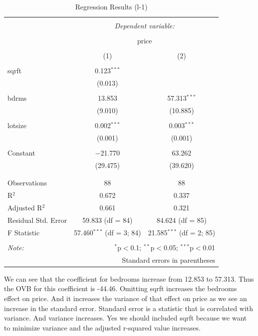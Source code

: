 \documentclass[
  12pt,
  landscape]{article}
\begin{document}
\begin{table}[!htbp] \centering 
  \caption{Regression Results (l-1)} 
  \label{} 
\begin{tabular}{@{\extracolsep{5pt}}lcc} 
\\[-1.8ex]\hline 
\hline \\[-1.8ex] 
 & \multicolumn{2}{c}{\textit{Dependent variable:}} \\ 
\cline{2-3} 
\\[-1.8ex] & \multicolumn{2}{c}{price} \\ 
\\[-1.8ex] & (1) & (2)\\ 
\hline \\[-1.8ex] 
 sqrft & 0.123$^{***}$ &  \\ 
  & (0.013) &  \\ 
  & & \\ 
 bdrms & 13.853 & 57.313$^{***}$ \\ 
  & (9.010) & (10.885) \\ 
  & & \\ 
 lotsize & 0.002$^{***}$ & 0.003$^{***}$ \\ 
  & (0.001) & (0.001) \\ 
  & & \\ 
 Constant & $-$21.770 & 63.262 \\ 
  & (29.475) & (39.620) \\ 
  & & \\ 
\hline \\[-1.8ex] 
Observations & 88 & 88 \\ 
R$^{2}$ & 0.672 & 0.337 \\ 
Adjusted R$^{2}$ & 0.661 & 0.321 \\ 
Residual Std. Error & 59.833 (df = 84) & 84.624 (df = 85) \\ 
F Statistic & 57.460$^{***}$ (df = 3; 84) & 21.585$^{***}$ (df = 2; 85) \\ 
\hline 
\hline \\[-1.8ex] 
\textit{Note:}  & \multicolumn{2}{r}{$^{*}$p$<$0.1; $^{**}$p$<$0.05; $^{***}$p$<$0.01} \\ 
 & \multicolumn{2}{r}{Standard errors in parentheses} \\ 
\end{tabular} 
\end{table}

We can see that the coefficient for bedrooms increase from 12.853 to
57.313. Thus the OVB for this coefficient is -44.46. Omitting sqrft
increases the bedrooms effect on price. And it increases the variance of
that effect on price as we see an increase in the standard error.
Standard error is a statistic that is correlated with variance. And
variance increases. Yes we should included sqrft because we want to
minimize variance and the adjusted r-squared value increases.
\end{document}

